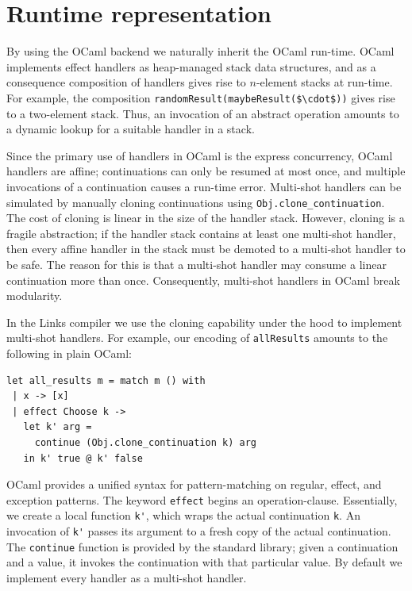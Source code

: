 \documentclass[preprint,numbers]{sigplanconf}
\newcommand{\msgbox}[2]{{%
  \par\noindent\small\color{red}%
  \framebox{\parbox{\dimexpr\linewidth-2\fboxsep-2\fboxrule}{\textbf{#1:} #2}}%
}}
\newcommand{\kc}[1]{\msgbox{KC}{#1}}
\begin{document}

\section{Runtime representation}
By using the OCaml backend we naturally inherit the OCaml run-time. OCaml
implements effect handlers as heap-managed stack data structures, and as a
consequence composition of handlers gives rise to $n$-element stacks at
run-time. For example, the composition
\lstinline[mathescape]!randomResult(maybeResult($\cdot$))! gives rise to a
two-element stack. Thus, an invocation of an abstract operation amounts to a
dynamic lookup for a suitable handler in a stack.

Since the primary use of handlers in OCaml is the express concurrency, OCaml
handlers are affine; continuations can only be resumed at most once, and
multiple invocations of a continuation causes a run-time error. Multi-shot
handlers can be simulated by manually cloning continuations using
\lstinline$Obj.clone_continuation$. The cost of cloning is linear in the size
of the handler stack. However, cloning is a fragile abstraction; if the handler
stack contains at least one multi-shot handler, then every affine handler in
the stack must be demoted to a multi-shot handler to be safe. The reason for
this is that a multi-shot handler may consume a linear continuation more than
once. Consequently, multi-shot handlers in OCaml break modularity.

In the Links compiler we use the cloning capability under the hood to implement
multi-shot handlers. For example, our encoding of \lstinline$allResults$
amounts to the following in plain OCaml:
\begin{lstlisting}[style=ocaml]
let all_results m = match m () with
 | x -> [x]
 | effect Choose k -> 
   let k' arg = 
     continue (Obj.clone_continuation k) arg 
   in k' true @ k' false
\end{lstlisting}
OCaml provides a unified syntax for pattern-matching on regular, effect, and
exception patterns. The keyword \lstinline[style=ocaml]$effect$ begins an
operation-clause. Essentially, we create a local function \lstinline$k'$, which
wraps the actual continuation \lstinline$k$. An invocation of \lstinline$k'$
passes its argument to a fresh copy of the actual continuation. The
\lstinline$continue$ function is provided by the standard library; given a
continuation and a value, it invokes the continuation with that particular
value. By default we implement every handler as a multi-shot handler.
\end{document}
